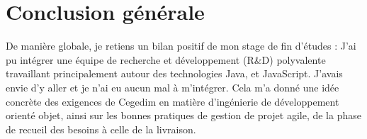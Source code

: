 
{}
\section*{Conclusion générale}

De manière globale, je retiens un bilan positif de mon stage de fin d'études : J'ai pu intégrer une équipe de recherche et développement (R\&D) polyvalente travaillant principalement autour des technologies Java, et JavaScript. J'avais envie d'y aller et je n'ai eu aucun mal à m'intégrer. Cela m'a donné une idée concrète des exigences de Cegedim en matière d'ingénierie de développement orienté objet, ainsi sur les bonnes pratiques de gestion de projet agile, de la phase de recueil des besoins à celle de la livraison.
